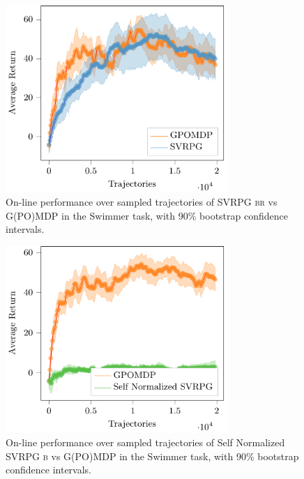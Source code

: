 \begin{figure}[h]
	\begin{minipage}[h]{1\textwidth}
		\centering
		\includegraphics[width=0.75\textwidth]{Images/Experiments/swimmer_GPOMDP_vs_SVRPG_B_reuse.pdf}
		\vspace{-0.1in}
		\caption{On-line performance over sampled trajectories of \acs{SVRPG} \textsc{br} vs G(PO)MDP in the Swimmer task, with 90\% bootstrap confidence intervals.}
		\label{fig:swimmersix}
	\end{minipage}
	\vspace{-0.15in}
\end{figure}


\begin{figure}[h]
	\begin{minipage}[h]{1\textwidth}
		\centering
		\includegraphics[width=0.75\textwidth]{Images/Experiments/swimmer_Self_SVRPG_vs_GPOMDP_B.pdf}
		\vspace{-0.1in}
		\caption{On-line performance over sampled trajectories of Self Normalized \acs{SVRPG} \textsc{b} vs G(PO)MDP in the Swimmer task, with 90\% bootstrap confidence intervals.}
		\label{fig:swimmerthree}
	\end{minipage}
	\vspace{-0.15in}
\end{figure}

